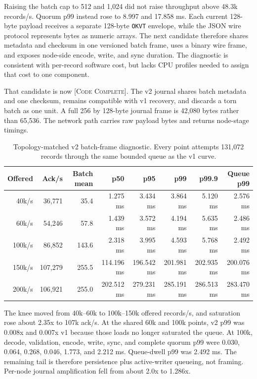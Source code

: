 \documentclass[sigconf,nonacm]{acmart}
\newcommand{\codecomplete}{\textsc{[Code Complete]}}
\begin{document}
Raising the batch cap to 512 and 1,024 did not raise throughput above 48.3k
records/s. Quorum p99 instead rose to 8.997 and 17.858 ms. Each current
128-byte payload receives a separate 128-byte \texttt{OKVT} envelope, while the
JSON wire protocol represents bytes as numeric arrays. The next candidate
therefore shares metadata and checksum in one versioned batch frame, uses a
binary wire frame, and exposes node-side encode, write, and sync duration. The
diagnostic is consistent with per-record software cost, but lacks CPU profiles
needed to assign that cost to one component.

That candidate is now \codecomplete{}. The v2 journal shares batch metadata and
one checksum, remains compatible with v1 recovery, and discards a torn batch as
one unit. A full 256 by 128-byte journal frame is 42,080 bytes rather than
65,536. The network path carries raw payload bytes and returns node-stage
timings.

\begin{table}[t]
  \centering
  \small
  \caption{Topology-matched v2 batch-frame diagnostic. Every point attempts
  131,072 records through the same bounded queue as the v1 curve.}
  \label{tab:txlogv2}
  \begin{tabularx}{\textwidth}{@{}r r r r r r r r@{}}
    \toprule
    Offered & Ack/s & Batch mean & p50 & p95 & p99 & p99.9 & Queue p99 \\
    \midrule
    40k/s  & 36,771  & 35.4  & 1.275 ms   & 3.434 ms   & 3.864 ms   & 5.120 ms   & 2.576 ms \\
    60k/s  & 54,246  & 57.8  & 1.439 ms   & 3.572 ms   & 4.194 ms   & 5.635 ms   & 2.486 ms \\
    100k/s & 86,852  & 143.6 & 2.318 ms   & 3.995 ms   & 4.593 ms   & 5.768 ms   & 2.492 ms \\
    150k/s & 107,279 & 255.5 & 114.196 ms & 196.542 ms & 201.981 ms & 202.935 ms & 200.076 ms \\
    200k/s & 106,921 & 255.0 & 202.512 ms & 279.231 ms & 285.191 ms & 286.513 ms & 283.470 ms \\
    \bottomrule
  \end{tabularx}
\end{table}

The knee moved from 40k--60k to 100k--150k offered records/s, and saturation
rose about 2.35x to 107k ack/s. At the shared 60k and 100k points, v2 p99 was
0.008x and 0.007x v1 because those loads no longer saturated the queue. At
100k, decode, validation, encode, write, sync, and complete quorum p99 were
0.030, 0.064, 0.268, 0.046, 1.773, and 2.212 ms. Queue-dwell p99 was 2.492 ms.
The remaining tail is therefore persistence plus active-writer queueing, not
framing. Per-node journal amplification fell from about 2.0x to 1.286x.
\end{document}
